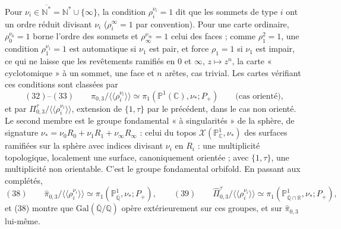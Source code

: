 \documentclass[11pt,a4paper]{article}
\begin{document}
Pour $\nu_i \in \overline{\mathbb{N}^*} = \mathbb{N}^* \cup \{\infty\}$, la
condition $\rho_i^{\nu_i} = 1$ dit que les sommets de type $i$ ont un ordre
réduit divisant $\nu_i$ ($\rho_i^{\infty} = 1$ par convention). Pour une carte
ordinaire, $\rho_0^{\nu_0} = 1$ borne l'ordre des sommets et
$\rho_\infty^{\nu_\infty} = 1$ celui des faces ; comme $\rho_1^2 = 1$, une
condition $\rho_1^{\nu_1} = 1$ est automatique si $\nu_1$ est pair, et force
$\rho_1 = 1$ si $\nu_1$ est impair, ce qui ne laisse que les revêtements
ramifiés en $0$ et $\infty$, $z \mapsto z^n$, la carte « cyclotomique » à un
sommet, une face et $n$ arêtes, cas trivial. Les cartes vérifiant ces
conditions sont classées par
\[
(32)\text{--}(33)\qquad \pi_{0,3}/\langle\langle \rho_i^{\nu_i} \rangle\rangle \simeq \pi_1(\mathbb{P}^1(\mathbb{C}), \nu_*; P_+)
\qquad \text{(cas orienté)},
\]
et par $\Pi^{\tau}_{0,3}/\langle\langle \rho_i^{\nu_i} \rangle\rangle$, extension
de $\{1, \tau\}$ par le précédent, dans le cas non orienté. Le second membre
est le groupe fondamental « à singularités » de la sphère, de signature
$\nu_* = \nu_0 R_0 + \nu_1 R_1 + \nu_\infty R_\infty$ : celui du topos
$\mathcal{X}(\mathbb{P}^1_{\mathbb{C}}, \nu_*)$ des surfaces ramifiées sur la
sphère avec indices divisant $\nu_i$ en $R_i$ : une multiplicité topologique,
localement une surface, canoniquement orientée ; avec $\{1, \tau\}$, une
multiplicité non orientable. C'est le groupe fondamental orbifold. En passant
aux complétés,
\[
(38)\qquad \widehat{\pi}_{0,3}/\langle\langle \rho_i^{\nu_i} \rangle\rangle \simeq \pi_1(\mathbb{P}^1_{\overline{\mathbb{Q}}}, \nu_*; P_+),
\qquad
(39)\qquad \widehat{\Pi}^{\tau}_{0,3}/\langle\langle \rho_i^{\nu_i} \rangle\rangle \simeq \pi_1(\mathbb{P}^1_{\overline{\mathbb{Q}} \cap \mathbb{R}}, \nu_*; P_+),
\]
et (38) montre que $\mathrm{Gal}(\overline{\mathbb{Q}}/\mathbb{Q})$ opère
extérieurement sur ces groupes, et sur $\widehat{\pi}_{0,3}$ lui-même.
\end{document}
